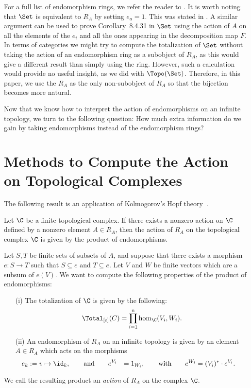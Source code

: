 \documentclass[a4paper,reqno,oneside]{article}
\begin{document}
For a full list of endomorphism rings, we refer the reader to \cite{johnstone2007topological}.  It is worth noting that $\Set$ is equivalent to $R_A$ by setting $e_a = 1$.  This was stated in \cite{johnstone2007topological}.  A similar argument can be used to prove Corollary~8.4.31 in $\Set$ using the action of $A$ on all the elements of the $e_i$ and all the ones appearing in the decomposition map $F$.  In terms of categories we might try to compute the totalization of $\Set$ without taking the action of an endomorphism ring as a subobject of $R_A$, as this would give a different result than simply using the ring.  However, such a calculation would provide no useful insight, as we did with $\Topo(\Set)$.   Therefore, in this paper, we use the $R_A$ as the only non-subobject of $R_A$ so that the bijection becomes more natural.

Now that we know how to interpret the action of endomorphisms on an infinite topology, we turn to the following question:  How much extra information do we gain by taking endomorphisms instead of the endomorphism rings?  

\section{Methods to Compute the Action on Topological Complexes}

The following result is an application of Kolmogorov's Hopf theory~\cite{kolmogorov2004hopf}.

\begin{theorem}
    Let $\C$ be a finite topological complex. If there exists a nonzero action on $\C$ defined by a nonzero element $A \in R_A$, then the action of $R_A$ on the topological complex $\C$ is given by the product of endomorphisms.
\end{theorem}

Let $S,T$ be finite sets of subsets of $A$, and suppose that there exists a morphism $e: S \to T$ such that $S \subseteq e$ and $T \subseteq e$.  Let $V$ and $W$ be finite vectors which are a subsum of $e(V)$.  We want to compute the following properties of the product of endomorphisms:
\begin{enumerate}
\item[(i)]
The totalization of $\C$ is given by the following:
$$
\Total_{[e]}(C) = \prod_{i=1}^n \hom_{\C}(V_i, W_i).
$$
\item[(ii)]
An endomorphism of $R_A$ on an infinite topology is given by an element $A \in R_A$ which acts on the morphisms
\begin{align*}
    e_k &:= v \mapsto \id_k, \qquad \text{and} \qquad e^{V_i} &= 1_{W_i}, \qquad  \text{with} \qquad e^{W_i} &= (V_i)^* \cdot e^{V_i}.
\end{align*}
\end{enumerate}
We call the resulting product an \textit{action} of $R_A$ on the complex $\C$.
\end{document}
